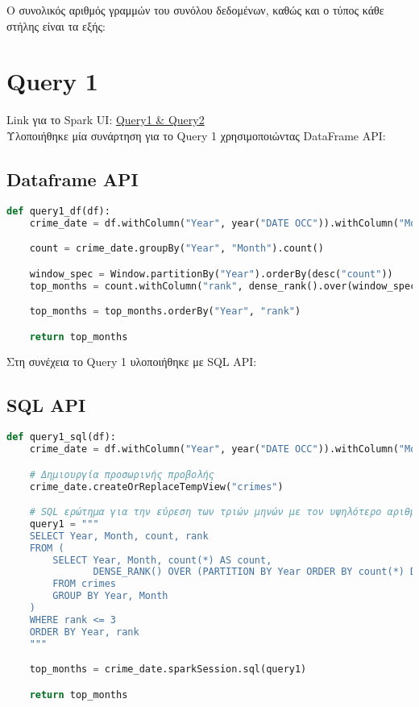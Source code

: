 \documentclass{article}
\begin{document}
Ο συνολικός αριθμός γραμμών του συνόλου δεδομένων, καθώς και ο τύπος κάθε στήλης είναι τα εξής:


\section{Query 1}

Link για το Spark UI:
\href{http://83.212.81.191:18080/history/application_1705357398960_0013/jobs/}{Query1 \& Query2} \\

Υλοποιήθηκε μία συνάρτηση για το Query 1 χρησιμοποιώντας DataFrame API: 
\subsection*{Dataframe API}

\begin{lstlisting}[language = Python]
    def query1_df(df):
    crime_date = df.withColumn("Year", year("DATE OCC")).withColumn("Month", month("DATE OCC"))

    count = crime_date.groupBy("Year", "Month").count()

    window_spec = Window.partitionBy("Year").orderBy(desc("count"))
    top_months = count.withColumn("rank", dense_rank().over(window_spec)).filter(col("rank") <= 3)

    top_months = top_months.orderBy("Year", "rank")

    return top_months
\end{lstlisting}  

Στη συνέχεια το Query 1 υλοποιήθηκε με SQL API:
\subsection*{SQL API}

\begin{lstlisting}[language = Python]
    def query1_sql(df):
    crime_date = df.withColumn("Year", year("DATE OCC")).withColumn("Month", month("DATE OCC"))

    # Δημιουργία προσωρινής προβολής
    crime_date.createOrReplaceTempView("crimes")

    # SQL ερώτημα για την εύρεση των τριών μηνών με τον υψηλότερο αριθμό εγκλημάτων ανά έτος
    query1 = """
    SELECT Year, Month, count, rank 
    FROM (
        SELECT Year, Month, count(*) AS count, 
               DENSE_RANK() OVER (PARTITION BY Year ORDER BY count(*) DESC) AS rank
        FROM crimes
        GROUP BY Year, Month
    ) 
    WHERE rank <= 3
    ORDER BY Year, rank
    """

    top_months = crime_date.sparkSession.sql(query1)

    return top_months

\end{lstlisting}  
\end{document}
